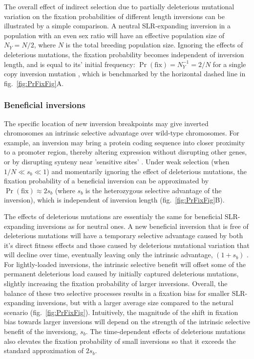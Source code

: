 \documentclass{article}[12pt]
\begin{document}
The overall effect of indirect selection due to partially deleterious mutational variation on the fixation probabilities of different length inversions can be illustrated by a simple comparison. A neutral SLR-expanding inversion in a population with an even sex ratio will have an effective population size of $N_Y = N/2$, where $N$ is the total breeding population size. Ignoring the effects of deleterious mutations, the fixation probability becomes independent of inversion length, and is equal to its' initial frequency: $\Pr(\text{fix}) = N_Y^{-1} = 2/N$ for a single copy inversion mutation \citep{Kimura1962, CrowKimura1970}, which is benchmarked by the horizontal dashed line in fig.~\ref{fig:PrFixFig}A.




\subsubsection*{Beneficial inversions}

The specific location of new inversion breakpoints may give inverted chromosomes an intrinsic selective advantage over wild-type chromosomes. For example, an inversion may bring a protein coding sequence into closer proximity to a promoter region, thereby altering expression without disrupting other genes, or by disrupting synteny near 'sensitive sites' \citep{KrimbasPowell1992, CorbettDetig2016}. Under weak selection (when $1/N \ll s_b \ll 1$) and momentarily ignoring the effect of deleterious mutations, the fixation probability of a beneficial inversion can be approximated by $\Pr(\text{fix}) \approx 2 s_{b}$ \citep{Haldane1927} (where $s_b$ is the heterozygous selective advantage of the inversion), which is independent of inversion length (fig.~\ref{fig:PrFixFig}B).

The effects of deleterious mutations are essentialy the same for beneficial SLR-expanding inversions as for neutral ones. A new beneficial inversion that is free of deleterious mutations will have a temporary selective advantage caused by both it's direct fitness effects and those caused by deleterious mutational variation that will decline over time, eventually leaving only the intrinsic advantage, $(1 + s_b)$ \citep{Nei1967}. For lightly-loaded inversions, the intrinsic selective benefit will offset some of the permanent deleterious load caused by initially captured deleterious mutations, slightly increasing the fixation probability of larger inversions. Overall, the balance of these two selective processes results in a fixation bias for smaller SLR-expanding inversions, but with a larger average size compared to the netural scenario (fig.~\ref{fig:PrFixFig}). Intuitively, the magnitude of the shift in fixation bias towards larger inversions will depend on the strength of the intrinsic selective benefit of the inversiong, $s_b$. The time-dependent effects of deleterious mutations also elevates the fixation probability of small inversions so that it exceeds the standard approximation of $2s_b$.
\end{document}
